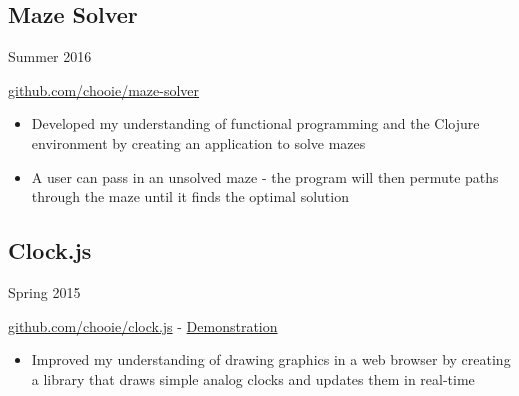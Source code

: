 \noindent\begin{minipage}[b]{0.8\textwidth}
  \subsection*{Maze Solver}
\end{minipage}
\noindent\begin{minipage}[b]{0.2\textwidth}
  \flushright
  Summer 2016
\end{minipage}

\href{https://github.com/chooie/maze-solver} {github.com/chooie/maze-solver}

\begin{itemize}
\item Developed my understanding of functional programming and the Clojure
  environment by creating an application to solve mazes

\item A user can pass in an unsolved maze - the program will then permute paths
  through the maze until it finds the optimal solution
\end{itemize}

\noindent\begin{minipage}[b]{0.8\textwidth}
  \subsection*{Clock.js}
\end{minipage}
\noindent\begin{minipage}[b]{0.2\textwidth}
  \flushright
  Spring 2015
\end{minipage}

\href{https://github.com/chooie/clock.js} {github.com/chooie/clock.js} -
\href {https://chooie.github.io/clock.js} {Demonstration}

\begin{itemize}
\item Improved my understanding of drawing graphics in a web browser by creating
  a library that draws simple analog clocks and updates them in real-time
\end{itemize}

